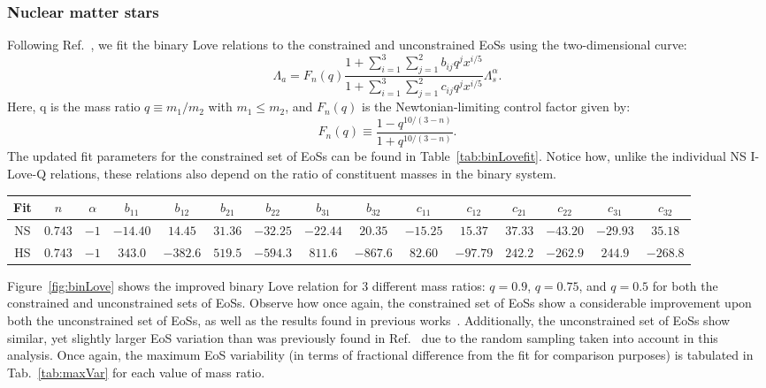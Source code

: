 \documentclass[prd,twocolumn,nofootinbib,superscriptaddress,amsmath,amssymb]{revtex4-1}
\begin{document}
\subsubsection{Nuclear matter stars}\label{sec:binLove-nuclear}
Following Ref.~\cite{Yagi:binLove}, we fit the binary Love relations to the constrained and unconstrained EoSs using the two-dimensional curve:
\begin{equation}\label{eq:binLovefit}
\Lambda_a=F_n(q) \frac{1+ \sum_{i=1}^3 \sum_{j=1}^2 b_{ij}q^j x^{i/5}}{1 + \sum_{i=1}^3 \sum_{j=1}^2 c_{ij}q^j x^{i/5}} \Lambda_s^{\alpha}.
\end{equation}
Here, q is the mass ratio $q \equiv m_1/m_2$ with $m_1 \leq m_2$, and $F_n(q)$ is the Newtonian-limiting control factor given by:
\begin{equation}
F_n(q) \equiv \frac{1-q^{10/(3-n)}}{1+q^{10/(3-n)}}.
\end{equation}
The updated fit parameters for the constrained set of EoSs can be found in Table~\ref{tab:binLovefit}.
Notice how, unlike the individual NS I-Love-Q relations, these relations also depend on the ratio of constituent masses in the binary system.
\begin{table*}
\centering
\caption{
Updated fit parameters for the binary Love relations, as given by the curve found in Eq.~\ref{eq:binLovefit}.
The bottom row corresponds to separate fits corresponding to the hybrid star branch of the hybrid EoSs.
}\label{tab:binLovefit}
\addtolength{\tabcolsep}{1pt} 
\begin{tabular}{c | c  c  c  c  c  c  c  c c c c c c c} 
 \hline
 \hline
 Fit & $n$ & $\alpha$ & $b_{11}$ & $b_{12}$ & $b_{21}$ & $b_{22}$ & $b_{31}$ & $b_{32}$ & $c_{11}$ & $c_{12}$ & $c_{21}$ & $c_{22}$ & $c_{31}$ & $c_{32}$\\
 \hline
 NS & $0.743$ & $-1$ & $-14.40$ & $14.45$ & $31.36$ & $-32.25$ & $-22.44$ & $20.35$ & $-15.25$ & $15.37$ & $37.33$ & $-43.20$ & $-29.93$ & $35.18$\\
 HS & $0.743$ & $-1$ & $343.0$ & $-382.6$ & $519.5$ & $-594.3$ & $811.6$ & $-867.6$ & $82.60$ & $-97.79$ & $242.2$ & $-262.9$ & $244.9$ & $-268.8$\\
 \hline
 \hline
\end{tabular}
\addtolength{\tabcolsep}{-1pt}
\end{table*}

Figure~\ref{fig:binLove} shows the improved binary Love relation for 3 different mass ratios: $q=0.9$, $q=0.75$, and $q=0.5$ for both the constrained and unconstrained sets of EoSs.
Observe how once again, the constrained set of EoSs show a considerable improvement upon both the unconstrained set of EoSs, as well as the results found in previous works~\cite{Yagi:binLove}.
Additionally, the unconstrained set of EoSs show similar, yet slightly larger EoS variation than was previously found in Ref.~\cite{Yagi:binLove} due to the random sampling taken into account in this analysis.
Once again, the maximum EoS variability (in terms of fractional difference from the fit for comparison purposes) is tabulated in Tab.~\ref{tab:maxVar} for each value of mass ratio.
\end{document}
